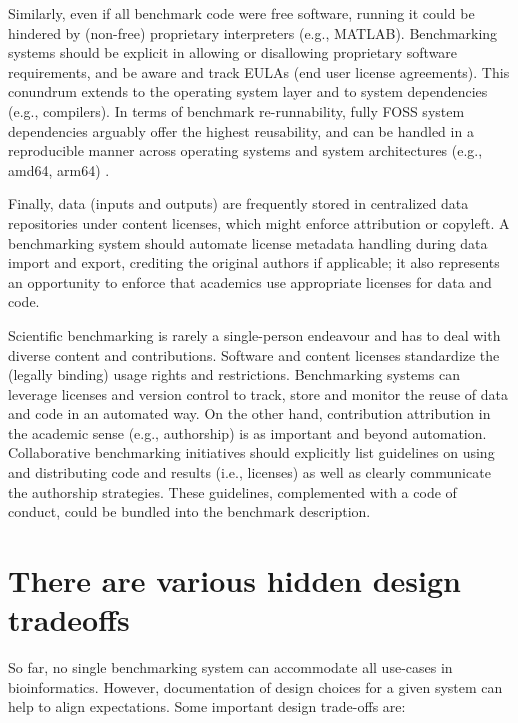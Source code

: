 \documentclass[11pt]{article}
\begin{document}

Similarly, even if all benchmark code were free software, running it could be hindered by (non-free) proprietary interpreters (e.g., MATLAB). Benchmarking systems should be explicit in allowing or disallowing proprietary software requirements, and be aware and track EULAs (end user license agreements). This conundrum extends to the operating system layer and to system dependencies (e.g., compilers). In terms of benchmark re-runnability, fully FOSS system dependencies arguably offer the highest reusability, and can be handled in a reproducible manner across operating systems and system architectures (e.g., amd64, arm64) \cite{Droge2023-ax}.

Finally, data (inputs and outputs) are frequently stored in centralized data repositories \cite{Potter2015-fs, Sicilia2017-ko, van-de-Sandt2019-wd} under content licenses, which might enforce attribution or copyleft. A benchmarking system should automate license metadata handling during data import and export, crediting the original authors if applicable; it also represents an opportunity to enforce that academics use appropriate licenses for data and code. 

Scientific benchmarking is rarely a single-person endeavour and has to deal with diverse content and contributions. Software and content licenses standardize the (legally binding) usage rights and restrictions. Benchmarking systems can leverage licenses and version control to track, store and monitor the reuse of data and code in an automated way. On the other hand, contribution attribution in the academic sense (e.g., authorship) is as important and beyond automation. Collaborative benchmarking initiatives should explicitly list guidelines on using and distributing code and results (i.e., licenses) as well as clearly communicate the authorship strategies. These guidelines, complemented with a code of conduct, could be bundled into the benchmark description. 

\section*{There are various hidden design tradeoffs}

So far, no single benchmarking system can accommodate all use-cases in bioinformatics. However, documentation of design choices for a given system can help to align expectations. Some important design trade-offs are:
\end{document}
